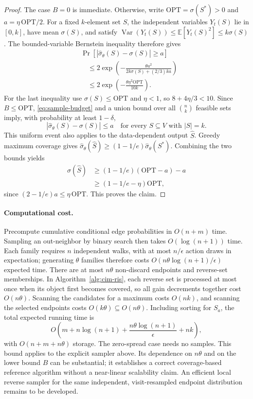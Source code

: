 \documentclass[sigconf]{acmart}
\newcommand{\E}{\mathbb{E}}
\begin{document}
\begin{proof}
The case $B=0$ is immediate. Otherwise, write
$\mathrm{OPT}=\sigma(S^*)>0$ and $a=\eta\,\mathrm{OPT}/2$.
For a fixed $k$-element set $S$, the independent variables $Y_t(S)$
lie in $[0,k]$, have mean $\sigma(S)$, and satisfy
$\operatorname{Var}(Y_t(S))\leq\E[Y_t(S)^2]\leq k\sigma(S)$.
The bounded-variable Bernstein inequality therefore gives
\begin{align*}
 &\Pr\!\left[|\hat\sigma_\theta(S)-\sigma(S)|\geq a\right]\\
 &\quad\leq2\exp\!\left(
       -\frac{\theta a^2}{2k\sigma(S)+(2/3)ka}\right)\\
 &\quad\leq2\exp\!\left(-\frac{\theta\eta^2\mathrm{OPT}}{10k}\right).
\end{align*}
For the last inequality use $\sigma(S)\leq\mathrm{OPT}$ and
$\eta<1$, so $8+4\eta/3<10$. Since $B\leq\mathrm{OPT}$,
\eqref{eq:sample-budget} and a union bound over all $\binom nk$
feasible sets imply, with probability at least $1-\delta$,
\[
  |\hat\sigma_\theta(S)-\sigma(S)|\leq a
  \quad\text{for every }S\subseteq V\text{ with }|S|=k.
\]
This uniform event also applies to the data-dependent output $\hat S$.
Greedy maximum coverage gives
$\hat\sigma_\theta(\hat S)\geq(1-1/e)\hat\sigma_\theta(S^*)$.
Combining the two bounds yields
\begin{align*}
  \sigma(\hat S)
    &\geq(1-1/e)(\mathrm{OPT}-a)-a\\
    &\geq(1-1/e-\eta)\mathrm{OPT},
\end{align*}
since $(2-1/e)a\leq\eta\,\mathrm{OPT}$. This proves the claim.
\end{proof}

\paragraph{Computational cost.}
Precompute cumulative conditional edge probabilities in $O(n+m)$
time. Sampling an out-neighbor by binary search then takes
$O(\log(n+1))$ time. Each family requires $n$ independent walks,
with at most $n/\epsilon$ action draws in expectation; generating
$\theta$ families therefore costs
$O(n\theta\log(n+1)/\epsilon)$ expected time.
There are at most $n\theta$ non-discard endpoints and reverse-set
memberships. In Algorithm~\ref{alg:cim-ris}, each reverse set is
processed at most once when its object first becomes covered, so all
gain decrements together cost $O(n\theta)$. Scanning the candidates
for a maximum costs $O(nk)$, and scanning the selected endpoints
costs $O(k\theta)\subseteq O(n\theta)$.
Including sorting for $S_a$, the total expected running time is
\[
  O\!\left(m+n\log(n+1)
       +\frac{n\theta\log(n+1)}{\epsilon}+nk\right),
\]
with $O(n+m+n\theta)$ storage. The zero-spread case needs no samples.
This bound applies to the explicit sampler above. Its dependence on
$n\theta$ and on the lower bound $B$ can be substantial; it establishes
a correct coverage-based reference algorithm without a near-linear
scalability claim. An efficient local reverse sampler for the same
independent, visit-resampled endpoint distribution remains to be developed.
\end{document}
